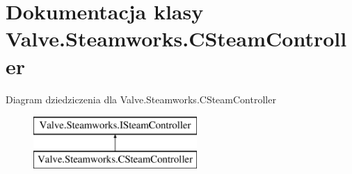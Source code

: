 \hypertarget{class_valve_1_1_steamworks_1_1_c_steam_controller}{}\section{Dokumentacja klasy Valve.\+Steamworks.\+C\+Steam\+Controller}
\label{class_valve_1_1_steamworks_1_1_c_steam_controller}
Diagram dziedziczenia dla Valve.\+Steamworks.\+C\+Steam\+Controller\begin{figure}[H]
\begin{center}
\leavevmode
\includegraphics[height=2.000000cm]{class_valve_1_1_steamworks_1_1_c_steam_controller}
\end{center}
\end{figure}
